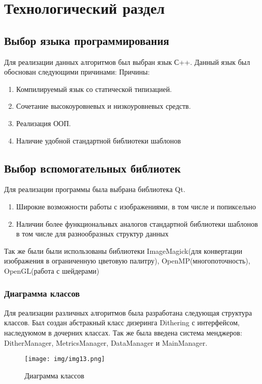 \chapter{Технологический раздел}
\section{Выбор  языка программирования}
Для реализации данных алгоритмов был выбран язык  С++. Данный язык был обоснован следующими причинами:
Причины:
\begin{enumerate}
	 \item Компилируемый язык со статической типизацией. 
	 \item Сочетание высокоуровневых и низкоуровневых средств.
	 \item Реализация ООП.
	 \item Наличие удобной стандартной библиотеки шаблонов
	 \end{enumerate}
\section{Выбор вспомогательных библиотек}
Для реализации программы была выбрана библиотека Qt.
\begin{enumerate}
	\item Широкие возможности работы с изображениями, в том числе и попиксельно
	\item Наличии более функциональных аналогов стандартной библиотеки шаблонов в том числе для разнообразных структур данных
\end{enumerate}
Так же были были использованы библиотеки ImageMagick(для конвертации изображения в ограниченную цветовую палитру), OpenMP(многопоточность), OpenGL(работа с шейдерами)
\subsection{Диаграмма классов}
Для реализации различных алгоритмов была разработана следующая структура классов. Был создан абстракный класс дизеринга Dithering с интерфейсом, наследуюмом в дочерних классах. Так же была введена система менджеров: DitherManager, MetricsManager, DataManager и MainManager.
\begin{figure}[h!]
	\centering
	\texttt{[image: img/img13.png]}
	\caption{Диаграмма классов}
	\label{fig:spire03}
\end{figure}

